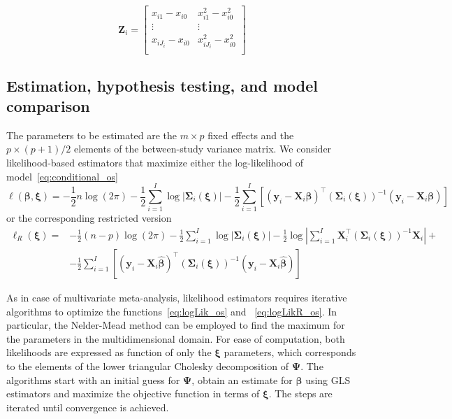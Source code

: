 \documentclass[11pt,a4paper,twoside,openany]{book}\usepackage{knitr}
\begin{document}
{{\begin{equation*}
\mathbf{Z}_i =
	\begin{bmatrix}
		x_{i1} - x_{i0}  & x_{i1}^2 - x_{i0}^2 \\
		\vdots & \vdots \\
		x_{iJ_i} - x_{i0}  & x_{iJ_i}^2 - x_{i0}^2 \\
	\end{bmatrix}
\end{equation*} 

\subsection{Estimation, hypothesis testing, and model comparison}

The parameters to be estimated are the $m\times p$ fixed effects and the $p \times (p+1)/2$ elements of the between-study variance matrix. We consider likelihood-based estimators that maximize either the log-likelihood of model~\ref{eq:conditional_os}
\begin{equation}
\ell \left( \boldsymbol{\beta}, \boldsymbol{\xi} \right) = 
 -\frac{1}{2} n \log(2\pi)  -\frac{1}{2} \sum_{i=1}^I \log | \boldsymbol{\Sigma}_i \left( \boldsymbol{\xi} \right) |  -\frac{1}{2}\sum_{i=1}^I \left[ \left( \mathbf{y}_i -  \mathbf{X}_i \boldsymbol{\beta} \right)^\top \left( \boldsymbol{\Sigma}_i \left( \boldsymbol{\xi} \right) \right)^{-1} \left( \mathbf{y}_i -  \mathbf{X}_i \boldsymbol{\beta} \right) \right]
\label{eq:logLik_os}
\end{equation}
\noindent or the corresponding restricted version
\begin{equation}
\begin{split}
\ell_R \left( \boldsymbol{\xi} \right) = & 
 -\frac{1}{2} (n - p) \log(2\pi)  - \frac{1}{2} \sum_{i=1}^I \log | \boldsymbol{\Sigma}_i \left( \boldsymbol{\xi} \right) |  - \frac{1}{2} \log \left| \sum_{i=1}^I \mathbf{X}_i^\top \left( \boldsymbol{\Sigma}_i \left( \boldsymbol{\xi} \right) \right)^{-1}  \mathbf{X}_i  \right| + \\
&-\frac{1}{2}\sum_{i=1}^I \left[ \left( \mathbf{y}_i -  \mathbf{X}_i \boldsymbol{\hat \beta} \right)^\top \left( \boldsymbol{\Sigma}_i \left( \boldsymbol{\xi} \right) \right)^{-1} \left( \mathbf{y}_i -  \mathbf{X}_i \boldsymbol{\hat \beta} \right) \right]
\end{split}
\label{eq:logLikR_os}
\end{equation}

\noindent As in case of multivariate meta-analysis, likelihood estimators requires iterative algorithms to optimize the functions~\ref{eq:logLik_os} and ~\ref{eq:logLikR_os}. 
In particular, the Nelder-Mead method can be employed to find the maximum for the parameters in the multidimensional domain. For ease of computation, both likelihoods are expressed as function of only the $\boldsymbol{\xi}$ parameters, which corresponds to the elements of the lower triangular Cholesky decomposition of $\boldsymbol{\Psi}$. The algorithms start with an initial guess for $\boldsymbol{\Psi}$, obtain an estimate for $\boldsymbol{\beta}$ using GLS estimators and maximize the objective function in terms of $\boldsymbol{\xi}$. The steps are iterated until convergence is achieved.

}}
\end{document}
